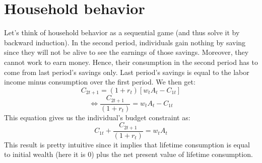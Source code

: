 \documentclass[12pt]{report}
\begin{document}
\section{Household behavior}

Let's think of household behavior as a sequential game (and thus solve it by backward induction). In the second period, individuals gain nothing by saving since they will not be alive to see the earnings of those savings. Moreover, they cannot work to earn money. Hence, their consumption in the second period has to come from last period's savings only. Last period's savings is equal to the labor income minus consumption over the first period. We then get: $$C_{2t+1} = (1+r_t)[w_tA_t - C_{1t}] $$ $$\Leftrightarrow \frac{C_{2t+1}}{(1+r_t)} = w_tA_t - C_{1t} $$ This equation gives us the individual's budget constraint as: $$C_{1t} + \frac{C_{2t+1}}{(1+r_t)} = w_tA_t $$ This result is pretty intuitive since it implies that lifetime consumption is equal to initial wealth (here it is $0$) plus the net present value of lifetime consumption.
\end{document}
